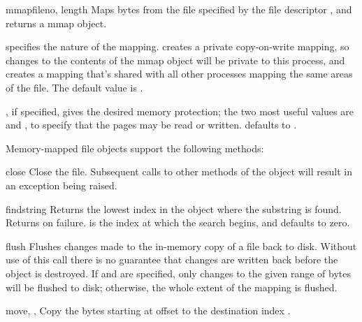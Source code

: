 \begin{funcdesc}{mmap}{fileno, length}
  Maps  bytes from the file
specified by the file descriptor , and returns a mmap object.

 specifies the nature of the mapping.  
 creates a private copy-on-write mapping, so
changes to the contents of the mmap object will be private to this
process, and  creates a mapping that's shared
with all other processes mapping the same areas of the file.
The default value is .

, if specified, gives the desired memory protection; the two 
most useful values are  and ,
to specify that the pages may be read or written.
 defaults to .
\end{funcdesc}


Memory-mapped file objects support the following methods:


\begin{methoddesc}{close}{}
Close the file.  Subsequent calls to other methods of the object
will result in an exception being raised.
\end{methoddesc}

\begin{methoddesc}{find}{string}
Returns the lowest index in the object where the substring
 is found.  Returns  on failure.   is
the index at which the search begins, and defaults to zero.
\end{methoddesc}

\begin{methoddesc}{flush}{}
Flushes changes made to the in-memory copy of a file back to disk.
Without use of this call there is no guarantee that changes are
written back before the object is destroyed.  If  and
 are specified, only changes to the given range of bytes
will be flushed to disk; otherwise, the whole extent of the mapping is
flushed.
\end{methoddesc}

\begin{methoddesc}{move}{, , }
Copy the  bytes starting at offset  
to the destination index .
\end{methoddesc}

